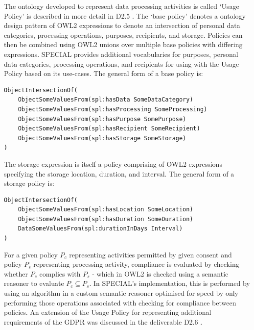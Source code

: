 The ontology developed to represent data processing activities is called `Usage Policy' \cite{bonatti_special_2018-2} is described in more detail in D2.5 \cite{bonatti_d2.5_2018}. The `base policy' denotes a ontology design pattern of OWL2 expressions to denote an intersection of personal data categories, processing operations, purposes, recipients, and storage. Policies can then be combined using OWL2 unions over multiple base policies with differing expressions. SPECIAL provides additional vocabularies for purposes, personal data categories, processing operations, and recipients for using with the Usage Policy based on its use-cases. The general form of a base policy is:
\begin{listing}[htbp]
\begin{verbatim}
ObjectIntersectionOf(
    ObjectSomeValuesFrom(spl:hasData SomeDataCategory)
    ObjectSomeValuesFrom(spl:hasProcessing SomeProcessing)
    ObjectSomeValuesFrom(spl:hasPurpose SomePurpose)
    ObjectSomeValuesFrom(spl:hasRecipient SomeRecipient)
    ObjectSomeValuesFrom(spl:hasStorage SomeStorage)
)
\end{verbatim}
\end{listing}
The storage expression is itself a policy comprising of OWL2 expressions specifying the storage location, duration, and interval. The general form of a storage policy is:
\begin{listing}[htbp]
\begin{verbatim}
ObjectIntersectionOf(
    ObjectSomeValuesFrom(spl:hasLocation SomeLocation)
    ObjectSomeValuesFrom(spl:hasDuration SomeDuration)
    DataSomeValuesFrom(spl:durationInDays Interval)
)
\end{verbatim}
\end{listing}

For a given policy $P_c$ representing activities permitted by given consent and policy $P_s$ representing processing activity, compliance is evaluated by checking whether $P_c$ complies with $P_s$ - which in OWL2 is checked using a semantic reasoner to evaluate $P_c \subseteq P_s$. In SPECIAL's implementation, this is performed by using an algorithm \cite{bonatti_fast_2018,bonatti_richer_2019} in a custom semantic reasoner optimised for speed by only performing those operations associated with checking for compliance between policies.
An extension of the Usage Policy for representing additional requirements of the GDPR was discussed in the deliverable D2.6 \cite{bonatti_d2.6_2018}.

